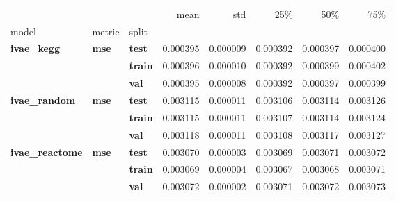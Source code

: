 \begin{tabular}{lllrrrrr}
\toprule
 &  &  & mean & std & 25\% & 50\% & 75\% \\
model & metric & split &  &  &  &  &  \\
\midrule
\multirow[t]{3}{*}{\textbf{ivae\_kegg}} & \multirow[t]{3}{*}{\textbf{mse}} & \textbf{test} & 0.000395 & 0.000009 & 0.000392 & 0.000397 & 0.000400 \\
\textbf{} & \textbf{} & \textbf{train} & 0.000396 & 0.000010 & 0.000392 & 0.000399 & 0.000402 \\
\textbf{} & \textbf{} & \textbf{val} & 0.000395 & 0.000008 & 0.000392 & 0.000397 & 0.000399 \\
\cline{1-8} \cline{2-8}
\multirow[t]{3}{*}{\textbf{ivae\_random}} & \multirow[t]{3}{*}{\textbf{mse}} & \textbf{test} & 0.003115 & 0.000011 & 0.003106 & 0.003114 & 0.003126 \\
\textbf{} & \textbf{} & \textbf{train} & 0.003115 & 0.000011 & 0.003107 & 0.003114 & 0.003124 \\
\textbf{} & \textbf{} & \textbf{val} & 0.003118 & 0.000011 & 0.003108 & 0.003117 & 0.003127 \\
\cline{1-8} \cline{2-8}
\multirow[t]{3}{*}{\textbf{ivae\_reactome}} & \multirow[t]{3}{*}{\textbf{mse}} & \textbf{test} & 0.003070 & 0.000003 & 0.003069 & 0.003071 & 0.003072 \\
\textbf{} & \textbf{} & \textbf{train} & 0.003069 & 0.000004 & 0.003067 & 0.003068 & 0.003071 \\
\textbf{} & \textbf{} & \textbf{val} & 0.003072 & 0.000002 & 0.003071 & 0.003072 & 0.003073 \\
\cline{1-8} \cline{2-8}
\bottomrule
\end{tabular}
